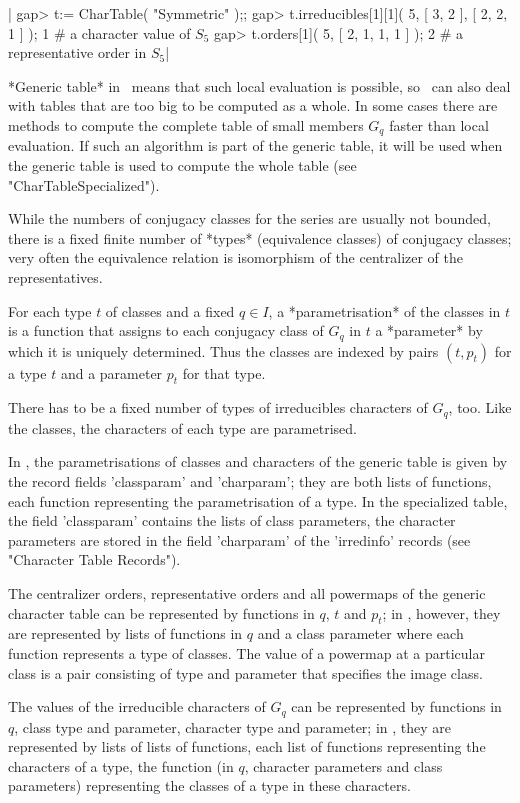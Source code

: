 |    gap> t:= CharTable( "Symmetric" );;
    gap> t.irreducibles[1][1]( 5, [ 3, 2 ], [ 2, 2, 1 ] );
    1  # a character value of $S_5$
    gap> t.orders[1]( 5, [ 2, 1, 1, 1 ] );
    2  # a representative order in $S_5$|

*Generic table* in \GAP\ means that such local evaluation is possible, so
\GAP\ can also deal with  tables  that  are too big to  be computed as  a
whole.  In  some cases there are methods to compute the complete table of
small  members $G_q$ faster than  local evaluation.  If such an algorithm
is part of the generic table, it will be used when the  generic table  is
used to compute the whole table (see "CharTableSpecialized").

While the numbers  of  conjugacy classes for  the series are  usually not
bounded, there is  a fixed finite number of *types* (equivalence classes)
of conjugacy classes;  very often the equivalence relation is isomorphism
of the centralizer of the representatives.

For each type $t$ of classes and a fixed $q\in I$, a *parametrisation* of
the classes in $t$ is  a function that assigns to each conjugacy class of
$G_q$ in $t$  a *parameter* by which it is uniquely determined.  Thus the
classes  are indexed by pairs  $(t,p_t)$  for a  type $t$ and a parameter
$p_t$ for that type.

There has  to be a  fixed  number of  types of irreducibles characters of
$G_q$,  too.  Like  the  classes,  the   characters  of  each  type   are
parametrised.

In \GAP, the parametrisations of  classes and  characters of the  generic
table is given by the record  fields 'classparam'  and 'charparam';  they
are   both  lists   of   functions,   each  function   representing   the
parametrisation  of  a  type.   In  the   specialized  table,  the  field
'classparam'  contains  the  lists  of  class parameters,  the  character
parameters are stored in the field 'charparam' of the 'irredinfo' records
(see "Character Table Records").

The centralizer orders, representative orders  and all  powermaps  of the
generic character table can be represented by  functions in $q$,  $t$ and
$p_t$; in \GAP, however, they  are represented by  lists of  functions in
$q$  and a  class  parameter where  each function represents  a  type  of
classes.   The  value of  a  powermap  at  a particular  class  is a pair
consisting of type and parameter that specifies the image class.

The values  of the irreducible characters of $G_q$ can be  represented by
functions in $q$, class type and parameter, character type and parameter;
in  \GAP, they are  represented by lists of lists of functions, each list
of functions representing the characters of a type, the function (in $q$,
character parameters and class parameters) representing  the classes of a
type in these characters.

